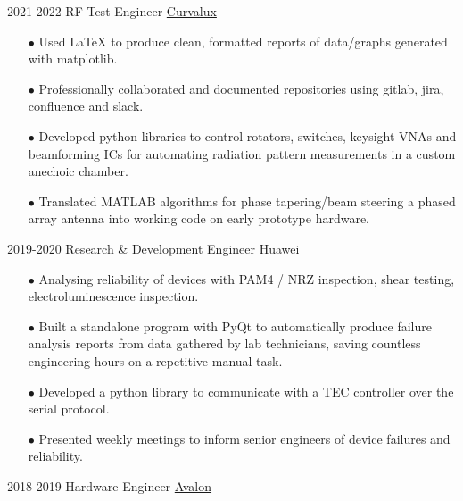 \documentclass[9pt]{developercv} %
\begin{document}
	\begin{entrylist}
		\entry
			{2021-2022}
			{RF Test Engineer}
			{\href{https://Curvalux.com}{Curvalux}}
			{	
				\begin{itemize}
					\item[$\bullet$\hspace*{0.5cm}] Used LaTeX to produce clean, formatted reports of data/graphs generated with matplotlib. 
					\item[$\bullet$\hspace*{0.5cm}] Professionally collaborated and documented repositories using gitlab, jira, confluence and slack.
					\item[$\bullet$\hspace*{0.5cm}] Developed python libraries to control rotators, switches, keysight VNAs and beamforming ICs for automating radiation pattern measurements in a custom anechoic chamber.
					\item[$\bullet$\hspace*{0.5cm}] Translated MATLAB algorithms for phase tapering/beam steering a phased array antenna into working code on early prototype hardware.				
				\end{itemize}
			}
		\entry
			{2019-2020}
			{Research \& Development Engineer}
			{\href{https://www.huawei.com/uk/contact-us}{Huawei}}
			{
				\begin{itemize}
					\item[$\bullet$\hspace*{0.5cm}] Analysing reliability of devices with PAM4 / NRZ inspection, shear testing, electroluminescence inspection.
					\item[$\bullet$\hspace*{0.5cm}] Built a standalone program with PyQt to automatically produce failure analysis reports from data gathered by lab technicians, saving countless engineering hours on a repetitive manual task.
					\item[$\bullet$\hspace*{0.5cm}] Developed a python library to communicate with a TEC controller over the serial protocol.
					\item[$\bullet$\hspace*{0.5cm}] Presented weekly meetings to inform senior engineers of device failures and reliability.
				\end{itemize}
			}
			\entry
			{2018-2019}
			{Hardware Engineer}
			{\href{https://avalonrov.wixsite.com/avalonrov}{Avalon}}
			{
				\begin{itemize}

\end{itemize}}
\end{entrylist}
\end{document}
